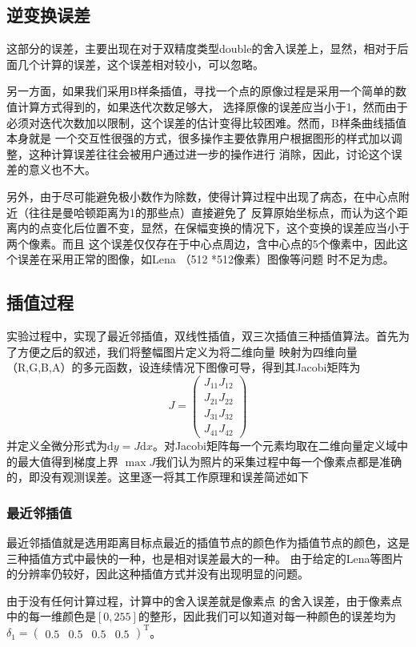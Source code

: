 \documentclass[UTF8,a4paper]{paper}\usepackage[utf8]{inputenc}\usepackage{algorithm}
\begin{document}
\subsection{逆变换误差}
这部分的误差，主要出现在对于双精度类型double的舍入误差上，显然，相对于后面几个计算的误差，这个误差相对较小，可以忽略。

另一方面，如果我们采用B样条插值，寻找一个点的原像过程是采用一个简单的数值计算方式得到的，如果迭代次数足够大，
选择原像的误差应当小于1，然而由于必须对迭代次数加以限制，这个误差的估计变得比较困难。然而，B样条曲线插值本身就是
一个交互性很强的方式，很多操作主要依靠用户根据图形的样式加以调整，这种计算误差往往会被用户通过进一步的操作进行
消除，因此，讨论这个误差的意义也不大。

另外，由于尽可能避免极小数作为除数，使得计算过程中出现了病态，在中心点附近（往往是曼哈顿距离为1的那些点）直接避免了
反算原始坐标点，而认为这个距离内的点变化后位置不变，显然，在保幅变换的情况下，这个变换的误差应当小于两个像素。而且
这个误差仅仅存在于中心点周边，含中心点的5个像素中，因此这个误差在采用正常的图像，如Lena （512 *512像素）图像等问题
时不足为虑。
\subsection{插值过程}
实验过程中，实现了最近邻插值，双线性插值，双三次插值三种插值算法。首先为了方便之后的叙述，我们将整幅图片定义为将二维向量
映射为四维向量（R,G,B,A）的多元函数，设连续情况下图像可导，得到其Jacobi矩阵为
$$J = \begin{pmatrix}J_{11} J_{12}\\ J_{21} J_{22}\\ J_{31} J_{32}\\ J_{41} J_{42}\end{pmatrix}$$ 
并定义全微分形式为$\mathrm{d} y = J\mathrm{d} x$。对Jacobi矩阵每一个元素均取在二维向量定义域中的最大值得到梯度上界
$\max J$我们认为照片的采集过程中每一个像素点都是准确的，即没有观测误差。这里逐一将其工作原理和误差简述如下
\subsubsection{最近邻插值}
最近邻插值就是选用距离目标点最近的插值节点的颜色作为插值节点的颜色，这是三种插值方式中最快的一种，也是相对误差最大的一种。
由于给定的Lena等图片的分辨率仍较好，因此这种插值方式并没有出现明显的问题。

由于没有任何计算过程，计算中的舍入误差就是像素点
的舍入误差，由于像素点中的每一维颜色是$[0,255]$的整形，因此我们可以知道对每一种颜色的误差均为
$\delta_1 = \begin{pmatrix}0.5 & 0.5 & 0.5 & 0.5 \end{pmatrix}^\mathrm{T}$。
\end{document}
